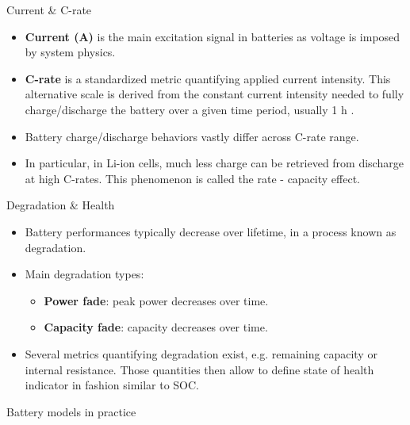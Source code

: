 \begin{frame}{Current \& C-rate}
\begin{itemize}
  \item \textbf{Current (A)} is the main excitation signal in batteries as voltage is imposed by system physics.
  \item \textbf{C-rate} is a standardized metric quantifying applied current intensity. This alternative scale is derived from the constant current intensity needed to fully charge/discharge the battery over a given time period, usually 1 h .
  \item Battery charge/discharge behaviors vastly differ across C-rate range.
  \item In particular, in Li-ion cells, much less charge can be retrieved from discharge at high C-rates. This phenomenon is called the rate - capacity effect.
\end{itemize}

\end{frame}\begin{frame}{Degradation \& Health}
\begin{itemize}
  \item Battery performances typically decrease over lifetime, in a process known as degradation.
  \item Main degradation types:
  \begin{itemize}    
    \item \textbf{Power fade}: peak power decreases over time.
    \item \textbf{Capacity fade}: capacity decreases over time.
  \end{itemize}
  \item Several metrics quantifying degradation exist, e.g. remaining capacity or internal resistance. Those quantities then allow to define state of health indicator in fashion similar to SOC.
\end{itemize}

\end{frame}\begin{frame}{Battery models in practice}


\end{frame}
